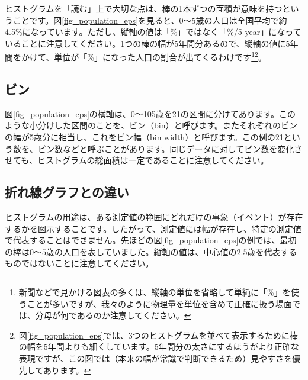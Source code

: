 

ヒストグラムを「読む」上で大切な点は、棒の1本ずつの面積が意味を持つということです。図\ref{fig_population_eps}を見ると、0〜5歳の人口は全国平均で約4.5\%になっています。ただし、縦軸の値は「\%」ではなく「\%/5 year」になっていることに注意してください。1つの棒の幅が5年間分あるので、縦軸の値に5年間をかけて、単位が「\%」になった人口の割合が出てくるわけです\footnote{新聞などで見かける図表の多くは、縦軸の単位を省略して単純に「\%」を使うことが多いですが、我々のように物理量を単位を含めて正確に扱う場面では、分母が何であるのか注意してください。}\footnote{図\ref{fig_population_eps}では、3つのヒストグラムを並べて表示するために棒の幅を5年間よりも細くしています。5年間分の太さにするほうがより正確な表現ですが、この図では（本来の幅が常識で判断できるため）見やすさを優先してあります。}。



\subsection{ビン}

図\ref{fig_population_eps}の横軸は、0〜105歳を21の区間に分けてあります。このような小分けした区間のことを、ビン（bin）と呼びます。またそれぞれのビンの幅が5歳分に相当し、これをビン幅（bin width）と呼びます。この例の21という数を、ビン数などと呼ぶことがあります。同じデータに対してビン数を変化させても、ヒストグラムの総面積は一定であることに注意してください。

\subsection{折れ線グラフとの違い}

ヒストグラムの用途は、ある測定値の範囲にどれだけの事象（イベント）が存在するかを図示することです。したがって、測定値には幅が存在し、特定の測定値で代表することはできません。先ほどの図\ref{fig_population_eps}の例では、最初の棒は$0$〜$5$歳の人口を表していました。縦軸の値は、中心値の$2.5$歳を代表するものではないことに注意してください。

